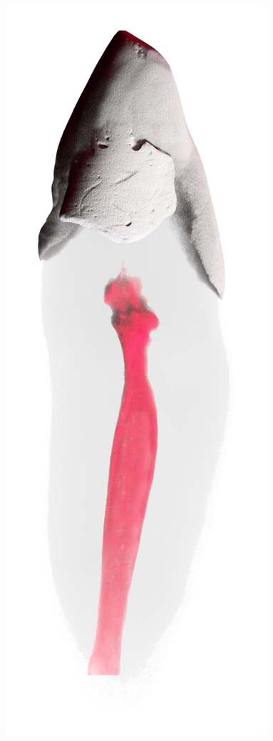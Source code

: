 \begin{frame}
\begin{frame}
		\includegraphics[height=\imheight]{./images/zmk/rcs/Tooth0752}%

\end{frame}
\end{frame}
